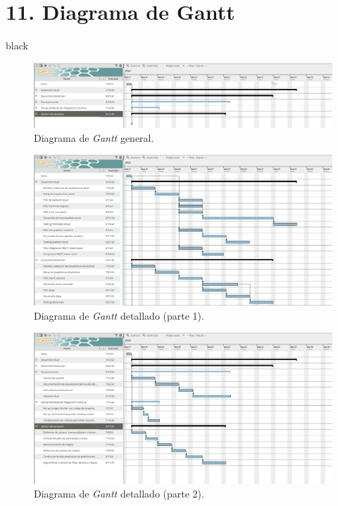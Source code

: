 \documentclass[
11pt, %
]{charter}
\begin{document}
\section{11. Diagrama de Gantt}
\label{sec:gantt}

\begin{consigna}{black}


\begin{figure}[htpb]
\centering
\includegraphics[width=.9\textwidth]{./Figuras/gantt-0}
\caption{Diagrama de \textit{Gantt} general.}
\label{fig:diagBloques}
\end{figure}

\begin{figure}[htpb]
\centering
\includegraphics[width=.9\textwidth]{./Figuras/gantt-1}
\caption{Diagrama de \textit{Gantt} detallado (parte 1).}
\label{fig:diagBloques}
\end{figure}


\begin{figure}[htpb]
\centering
\includegraphics[width=.9\textwidth]{./Figuras/gantt-2}
\caption{Diagrama de \textit{Gantt} detallado (parte 2).}
\label{fig:diagBloques}
\end{figure}
\end{consigna}
\end{document}
